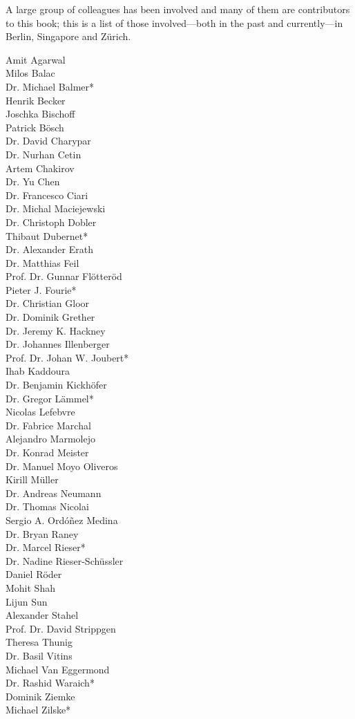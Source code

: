 A large group of colleagues has been involved and many of them are contributors to this book; this is a list of those involved---both in the past and currently---in Berlin, Singapore and Zürich.  
%
\begin{multicols}{3}
Amit Agarwal \\
Milos Balac  \\
Dr. Michael Balmer\mbox{*} \\
Henrik Becker \\
Joschka Bischoff \\
Patrick Bösch \\
Dr. David Charypar \\
Dr. Nurhan Cetin  \\
Artem Chakirov \\
Dr. Yu Chen \\
Dr. Francesco Ciari \\
Dr. Michal Maciejewski \\
Dr. Christoph Dobler \\
Thibaut Dubernet\mbox{*} \\
Dr. Alexander Erath \\
Dr. Matthias Feil \\
Prof. Dr. Gunnar Flötteröd \\
Pieter J. Fourie\mbox{*} \\
Dr. Christian Gloor \\
Dr. Dominik Grether \\
Dr. Jeremy K. Hackney \\
Dr. Johannes Illenberger \\
Prof. Dr. Johan W. Joubert\mbox{*} \\
Ihab Kaddoura \\
Dr. Benjamin Kickhöfer \\
Dr. Gregor Lämmel\mbox{*} \\
Nicolas Lefebvre \\
Dr. Fabrice Marchal \\
Alejandro Marmolejo \\
Dr. Konrad Meister \\
Dr. Manuel Moyo Oliveros \\
Kirill Müller \\
Dr. Andreas Neumann \\
Dr. Thomas Nicolai \\
Sergio A. Ordóñez Medina \\
Dr. Bryan Raney \\
Dr. Marcel Rieser\mbox{*} \\
Dr. Nadine Rieser-Schüssler \\
Daniel Röder \\
Mohit Shah \\
Lijun Sun \\
Alexander Stahel \\
Prof. Dr. David Strippgen \\
Theresa Thunig \\
Dr. Basil Vitins \\
Michael Van Eggermond \\
Dr. Rashid Waraich\mbox{*} \\
Dominik Ziemke \\
Michael Zilske\mbox{*} \\
\end{multicols}
